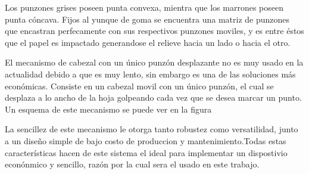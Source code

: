 Los punzones grises poseen punta convexa, mientra que los marrones poseen
punta c\'oncava. Fijos al yunque de goma se encuentra una matriz de punzones
que encastran perfecamente con sus respectivos punzones moviles, y es entre
\'estos que el papel es impactado generandose el relieve hacia un lado o hacia
el otro. 

El mecanismo de cabezal con un \'unico punz\'on desplazante no es muy usado
en la actualidad debido a que es muy lento, sin embargo es una de las
soluciones m\'as econ\'omicas. Consiste en un cabezal movil con un \'unico
punz\'on, el cual se desplaza a lo ancho de la hoja golpeando cada vez que se
desea marcar un punto. Un esquema de este mecanismo se puede ver en la figura 

%
%

La sencillez de este mecanismo le otorga tanto robustez como versatilidad,
junto a un dise\~no simple de bajo costo de produccion y mantenimiento.Todas
estas caracter\'isticas hacen de este sistema el ideal para implementar un
dispostivio econ\'onmico y sencillo, raz\'on por la cual sera el usado en
este trabajo.